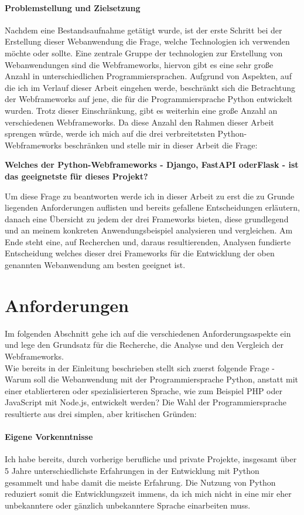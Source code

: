 \documentclass[letterpaper,11pt,leqno]{article}
\begin{document}
\paragraph{Problemstellung und Zielsetzung}
Nachdem eine Bestandsaufnahme getätigt wurde, ist der erste Schritt bei der Erstellung dieser Webanwendung die Frage, welche
Technologien ich verwenden möchte oder sollte. Eine zentrale Gruppe der technologien zur Erstellung von Webanwendungen sind die
Webframeworks, hiervon gibt es eine sehr große Anzahl in unterschiedlichen Programmiersprachen. Aufgrund von Aspekten, auf die ich
im Verlauf dieser Arbeit eingehen werde, beschränkt sich die Betrachtung der Webframeworks auf jene, die für die Programmiersprache
Python entwickelt wurden. Trotz dieser Einschränkung, gibt es weiterhin eine große Anzahl an verschiedenen Webframeworks. Da diese
Anzahl den Rahmen dieser Arbeit sprengen würde, werde ich mich auf die drei verbreitetsten Python-Webframeworks beschränken und
stelle mir in dieser Arbeit die Frage:\begin{center}\textbf{Welches der Python-Webframeworks - Django, FastAPI oderFlask - ist das
geeignetste für dieses Projekt?}\end{center}Um diese Frage zu beantworten werde ich in dieser Arbeit zu erst die zu Grunde liegenden
Anforderungen auflisten und bereits gefallene Entscheidungen erläutern, danach eine Übersicht zu jedem der drei Frameworks bieten,
diese grundlegend und an meinem konkreten Anwendungsbeispiel analysieren und vergleichen. Am Ende steht eine, auf Recherchen und,
daraus resultierenden, Analysen fundierte Entscheidung welches dieser drei Frameworks für die Entwicklung der oben genannten
Webanwendung am besten geeignet ist.

\section{Anforderungen}\label{s:anforderungen}
Im folgenden Abschnitt gehe ich auf die verschiedenen Anforderungsaspekte ein und lege den Grundsatz für die Recherche, die Analyse
und den Vergleich der Webframeworks.\\Wie bereits in der Einleitung beschrieben stellt sich zuerst folgende Frage - Warum soll die
Webanwendung mit der Programmiersprache Python, anstatt mit einer etablierteren oder spezialisierteren Sprache, wie zum Beispiel PHP
oder JavaScript mit Node.js, entwickelt werden? Die Wahl der Programmiersprache resultierte aus drei simplen, aber kritischen
Gründen:
\paragraph{Eigene Vorkenntnisse}Ich habe bereits, durch vorherige berufliche und private Projekte, insgesamt über 5 Jahre
unterschiedlichste Erfahrungen in der Entwicklung mit Python gesammelt und habe damit die meiste Erfahrung. Die Nutzung von Python
reduziert somit die Entwicklungszeit immens, da ich mich nicht in eine mir eher unbekanntere oder gänzlich unbekanntere Sprache
einarbeiten muss.
\end{document}

